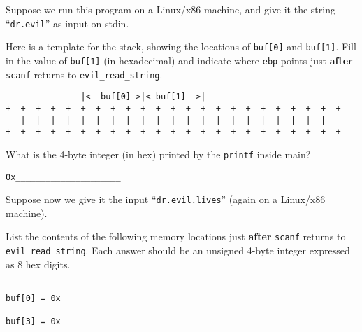 \begin{subproblem}
\item 
Suppose we run this program on a Linux/x86 machine, and give it the
string ``{\tt dr.evil}'' as input on stdin.

Here is a template for the stack, showing the locations of {\tt buf[0]}
and {\tt buf[1]}. Fill in the value of {\tt buf[1]} (in hexadecimal) and 
indicate where 
{\tt ebp} points just {\bf after} {\tt scanf} returns to {\tt evil\_read\_string}.

\begin{verbatim}
               |<- buf[0]->|<-buf[1] ->|
+--+--+--+--+--+--+--+--+--+--+--+--+--+--+--+--+--+--+--+--+--+--+
   |  |  |  |  |  |  |  |  |  |  |  |  |  |  |  |  |  |  |  |  |
+--+--+--+--+--+--+--+--+--+--+--+--+--+--+--+--+--+--+--+--+--+--+
\end{verbatim}

What is the 4-byte integer (in hex) printed by the {\tt printf} inside main? 

\begin{verbatim}
0x_____________________
\end{verbatim}


\newpage

\item
Suppose now we give it the input ``{\tt dr.evil.lives}'' (again on a
Linux/x86 machine).

\begin{subproblem}
\item
List the contents of the following
memory locations just {\bf after} {\tt scanf} returns to {\tt evil\_read\_string}.
Each answer should be an unsigned 4-byte integer expressed as 8 hex digits.

\begin{verbatim}

buf[0] = 0x____________________

buf[3] = 0x____________________

\end{verbatim}


\end{subproblem}
\end{subproblem}
